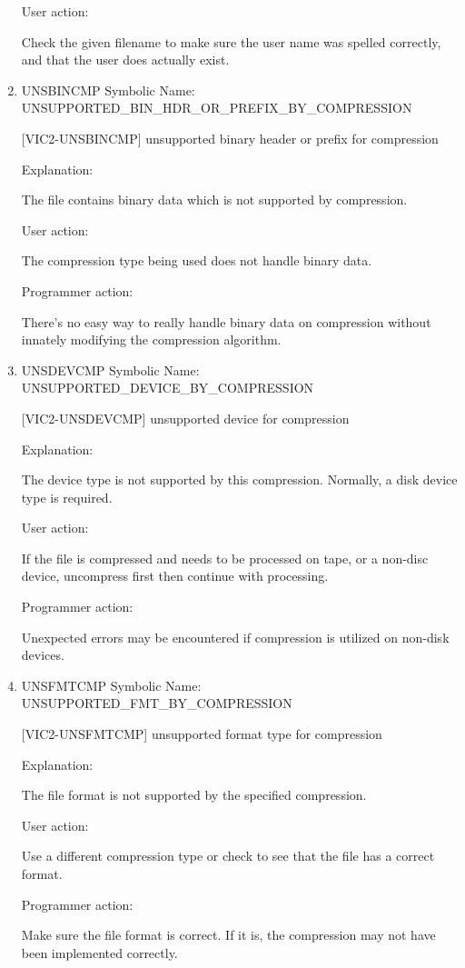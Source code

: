 \begin{enumerate}
User action:

Check the given filename to make sure the user name was spelled
correctly, and that the user does actually exist.


\item UNSBINCMP Symbolic Name: UNSUPPORTED\_BIN\_HDR\_OR\_PREFIX\_BY\_COMPRESSION

[VIC2-UNSBINCMP] unsupported binary header or prefix for compression

Explanation:

The file contains binary data which is not supported by compression.

User action:

The compression type being used does not handle binary data.

Programmer action:

There's no easy way to really handle binary data on compression
without innately modifying the compression algorithm.


\item UNSDEVCMP Symbolic Name: UNSUPPORTED\_DEVICE\_BY\_COMPRESSION

[VIC2-UNSDEVCMP] unsupported device for compression

Explanation:

The device type is not supported by this compression.  Normally,
a disk device type is required.

User action:

If the file is compressed and needs to be processed on tape,
or a non-disc device, uncompress first then continue with
processing.

Programmer action:

Unexpected errors may be encountered if compression is utilized
on non-disk devices.


\item UNSFMTCMP Symbolic Name: UNSUPPORTED\_FMT\_BY\_COMPRESSION

[VIC2-UNSFMTCMP] unsupported format type for compression

Explanation:

The file format is not supported by the specified compression.

User action:

Use a different compression type or check to see that the file has
a correct format.

Programmer action:

Make sure the file format is correct.  If it is, the compression
may not have been implemented correctly.



\end{enumerate}
